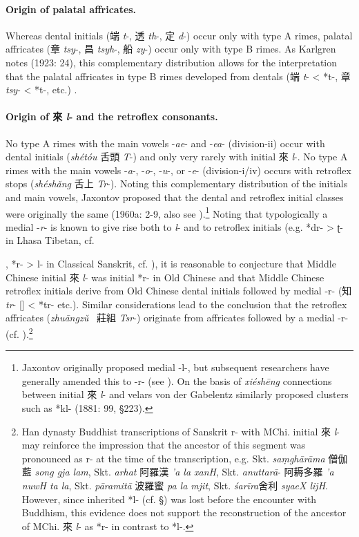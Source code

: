 \paragraph{Origin of palatal
affricates.} Whereas dental initials (端 \emph{t}-, 透
 \emph{th}-, 定 \emph{d}-) occur only with type A rimes, palatal
affricates (章 \emph{tsy}-, 昌 \emph{tsyh}-, 船 \emph{zy}-) occur only
with type B rimes. As Karlgren notes (1923: 24), this complementary
distribution allows for the interpretation that the palatal affricates
in type B rimes developed from dentals (端  \emph{t}- \textless{} *t{}-,
章  \emph{tsy}- \textless{} *t-, etc.) 
\citep[12]{Schuessler2009minimal}.

\paragraph{Origin of 來
 \emph{l}- and the retroflex consonants.}
No type A
rimes with the main vowels -\emph{ae}- and -\emph{ea}- (division-ii)
occur with dental initials (\emph{shétóu} 舌頭  \emph{T}-) and only very
rarely with initial 來 \emph{l}-. No type A rimes with the main vowels
-\emph{a}-, -\emph{o}-, -\emph{u}-, or -\emph{e}- (division-i/iv) occurs
with retroflex stops (\emph{shéshǎng} 舌上  \emph{Tr}-). Noting this
com­ple­men­tary distribution of the initials and main vowels, Jaxontov
proposed that the dental and retroflex initial classes were originally
the same (1960a: 2-9, also see 
\cite[262-267]{Baxter1992}).\footnote{Jaxontov
  originally proposed medial -l-, but subsequent researchers have
  generally amended this to -r- (see 
  \cite[262]{Baxter1992}). On the basis of
  \emph{xiéshēng} connections between initial 來 \emph{l}- and velars
  von der Gabelentz similarly proposed clusters such as *kl- (1881: 99,
  §223). } Noting that ty­po­lo­gi­cal­ly a medial -\emph{r}- is known
to give rise both to \emph{l}- and to retroflex initials (e.g. *dr-
\textgreater{} ʈ- in Lhasa Tibetan, cf. 

\citet[388]{Tournadre2009manuel},
*r- \textgreater{} l- in Classical Sanskrit, cf. 
\cite[204 §10.8, 211 §10.34]{Fortson2010}), it is reasonable to conjecture that Middle Chinese
initial 來 \emph{l}- was initial *r- in Old Chinese and that Middle
Chinese retroflex initials derive from Old Chinese dental initials
followed by medial -r- (知 \emph{tr}- [{}] \textless{} *tr- etc.).
Similar considerations lead to the conclusion that the retroflex
affricates (\emph{zhuāngzǔ~} 莊組 \emph{Tsr}-) originate from affricates
followed by a medial -r- (cf. 
\cite[203-206]{Baxter1992}).\footnote{Han
  dynasty Buddhist transcriptions of Sanskrit r- with MChi. initial 來
   \emph{l}- may reinforce the impression that the ancestor of this
  segment was pronounced as r- at the time of the transcription, e.g.
  Skt. \emph{saṃghārāma} 僧伽藍 \emph{song gja lam}, Skt. \emph{arhat}
  阿羅漢 \emph{'a la xanH}, Skt.  \emph{anuttarā}- 阿耨多羅 \emph{'a nuwH
  ta la}, Skt. \emph{pāramitā} 波羅蜜 \emph{pa la mjit}, Skt.
   \emph{śarīra}舍利 \emph{syaeX lijH}. However, since inherited *l- (cf.
  §) was lost before the encounter with Buddhism, this evidence does not
  support the reconstruction of the ancestor of MChi. 來  \emph{l}- as
  *r- in contrast to *l-.}

